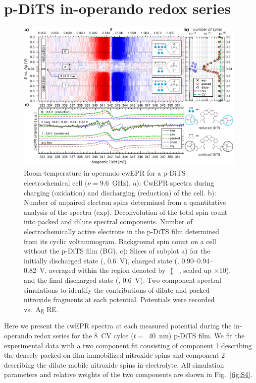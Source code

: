 \section{p-DiTS in-operando redox series}

\begin{figure}[H]
\center
	\includegraphics[width=1\textwidth]{./operando_epr/figures/Main_2D_redox_map_full.pdf}
	\caption{Room-temperature in-operando cwEPR for a p-DiTS electrochemical cell ($\nu = 9.6$~GHz). a): CwEPR spectra during charging (oxidation) and discharging (reduction) of the cell. b): Number of unpaired electron spins determined from a quantitative analysis of the spectra (exp). Deconvolution of the total spin count into packed and dilute spectral components. Number of electrochemically active electrons in the p-DiTS film determined from its cyclic voltammogram. Background spin count on a cell without the p-DiTS film (BG). c): Slices of subplot a) for the initially discharged state (, 0.6~V), charged state (, 0.90--0.94--0.82~V, averaged within the region denoted by $\updownarrow$~, scaled up $\times$10), and the final discharged state (, 0.6~V). Two-component spectral simulations to identify the contributions of dilute and packed nitroxide fragments at each potential. Potentials were recorded vs.\ Ag RE.}
	\label{fig:operando_carpet}
\end{figure}


Here we present the cwEPR spectra at each measured potential during the in-operando redox series for the 8~CV cylce ($t=$~40~nm) p-DiTS film. We fit the experimental data with a two component fit consisting of component 1 describing the densely packed on film immobilized nitroxide spins and component 2 describing the dilute mobile nitroxide spins in electrolyte. All simulation parameters and relative weights of the two components are shown in Fig.~\ref{fig:S4}.

